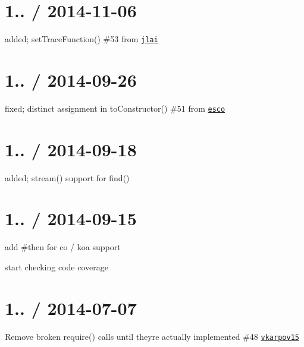 \section*{1.. / 2014-\/11-\/06 }


\begin{DoxyItemize}
\item added; set\+Trace\+Function() \#53 from \href{https://github.com/jlai}{\tt jlai}
\end{DoxyItemize}

\section*{1.. / 2014-\/09-\/26 }


\begin{DoxyItemize}
\item fixed; distinct assignment in to\+Constructor() \#51 from \href{https://github.com/esco}{\tt esco}
\end{DoxyItemize}

\section*{1.. / 2014-\/09-\/18 }


\begin{DoxyItemize}
\item added; stream() support for find()
\end{DoxyItemize}

\section*{1.. / 2014-\/09-\/15 }


\begin{DoxyItemize}
\item add \#then for co / koa support
\item start checking code coverage
\end{DoxyItemize}

\section*{1.. / 2014-\/07-\/07 }


\begin{DoxyItemize}
\item Remove broken require() calls until they\textquotesingle{}re actually implemented \#48 \href{https://github.com/vkarpov15}{\tt vkarpov15}
\end{DoxyItemize}


